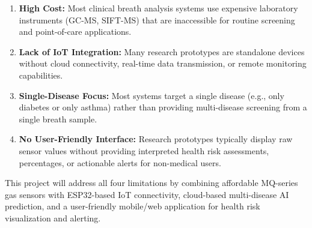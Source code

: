 \begin{enumerate}[leftmargin=1.5cm]
\item \textbf{High Cost:} Most clinical breath analysis systems use expensive laboratory instruments (GC-MS, SIFT-MS) that are inaccessible for routine screening and point-of-care applications.

\item \textbf{Lack of IoT Integration:} Many research prototypes are standalone devices without cloud connectivity, real-time data transmission, or remote monitoring capabilities.

\item \textbf{Single-Disease Focus:} Most systems target a single disease (e.g., only diabetes or only asthma) rather than providing multi-disease screening from a single breath sample.

\item \textbf{No User-Friendly Interface:} Research prototypes typically display raw sensor values without providing interpreted health risk assessments, percentages, or actionable alerts for non-medical users.
\end{enumerate}

This project will address all four limitations by combining affordable MQ-series gas sensors with ESP32-based IoT connectivity, cloud-based multi-disease AI prediction, and a user-friendly mobile/web application for health risk visualization and alerting.
